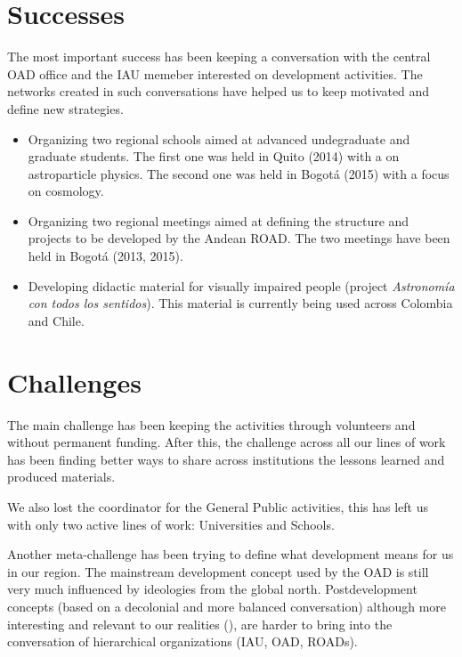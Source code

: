 \documentclass{iau}
\begin{document}
\section{Successes}

The most important success has been keeping a conversation with the
central OAD office and the IAU memeber interested on development
activities. 
The networks created in such conversations have helped us to keep
motivated and define new strategies.
\begin{itemize}
\item Organizing two regional schools aimed at advanced undegraduate
  and graduate students. The first one was held in Quito (2014) with a
  on astroparticle physics. The second one was held in Bogot\'a (2015)
  with a focus on cosmology.
\item Organizing two regional meetings aimed at defining the structure
  and projects to be developed by the Andean ROAD. The two meetings
  have been held in Bogot\'a (2013, 2015). 
\item Developing didactic material for visually impaired people
(project \emph{Astronom\'ia con todos los sentidos}). This
  material is currently being used across Colombia and Chile.
\end{itemize}



\section{Challenges}

The main challenge has been keeping the activities through volunteers
and without permanent funding. 
After this, the challenge across all our lines of work has been
finding better ways to share across institutions the lessons learned
and produced materials. 

We also lost the coordinator for the General Public activities, this
has left us with only two active lines of work: Universities and
Schools. 

Another meta-challenge has been trying to define what development means for
us in our region. 
The mainstream development concept used by the OAD is still very much
influenced by ideologies from the global north.
Postdevelopment concepts (based on a decolonial and more balanced
conversation) although more interesting and relevant to our realities
(\cite{Grosfoguel02}), are harder to bring into the conversation of
hierarchical organizations (IAU, OAD, ROADs).  
\end{document}
